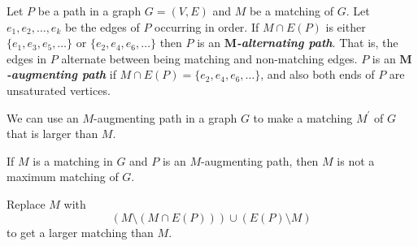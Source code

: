 \begin{Definition}{}{}
    Let $ P $ be a path in a graph $ G=(V,E) $ and $ M $ be a matching of $ G $. Let
    $ e_1,e_2,\ldots ,e_k $ be the edges of $ P $ occurring in order. If $ M\cap E(P) $
    is either $ \{e_1,e_3,e_5,\ldots \} $ or $ \{e_2,e_4,e_6,\ldots\} $ then $ P $
    is an \textbf{\emph{$ \bm{M} $-alternating path}}. That is, the edges in $ P $
    alternate between being matching and non-matching edges. $ P $
    is an \textbf{\emph{$ \bm{M} $-augmenting path}} if $ M\cap E(P)=\{e_2,e_4,e_6,\ldots \} $,
    and also both ends of $ P $ are unsaturated vertices.
\end{Definition}

We can use an $ M $-augmenting path in a graph $ G $ to make a matching $ M^\prime $
of $ G $ that is larger than $ M $.


\begin{Proposition}{}{}
    If $ M $ is a matching in $ G $ and $ P $ is an $ M $-augmenting path, then $ M $
    is not a maximum matching of $ G $.
\end{Proposition}

\begin{Proof}{}{}
    Replace $ M $ with
    \[ \left( M\setminus (M\cap E(P)) \right)\cup (E(P)\setminus M) \]
    to get a larger matching than $ M $.
\end{Proof}

